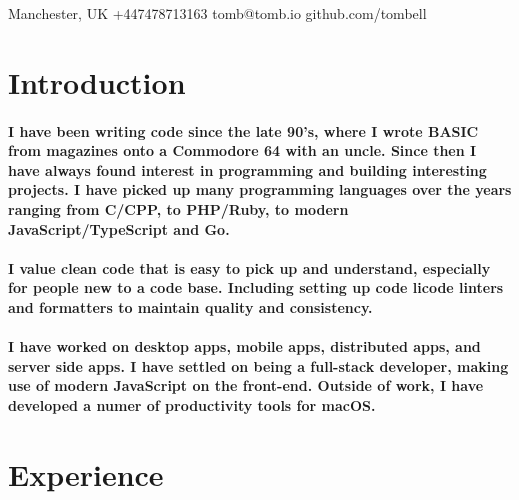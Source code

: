 \documentclass[a4paper]{article}
\author{Tom Bell}
\renewcommand{\maketitle}{
  \begin{center}
    \huge{\textbf\theauthor}
  \end{center}
}
\begin{document}
\maketitle

\begin{center}
  \raisebox{0\height}{\small\faMapMarker} Manchester, UK
  \hspace{1 cm}
  \raisebox{-0.1\height}{\small\faMobile} +447478713163
  \hspace{1 cm}
  \raisebox{-0.1\height}{\small\faEnvelope} tomb@tomb.io
  \hspace{1 cm}
  \raisebox{-0.1\height}{\small\faGithubAlt} github.com/tombell
\end{center}

\section{Introduction}
\paragraph{I have been writing code since the late 90's, where I wrote BASIC
from magazines onto a Commodore 64 with an uncle. Since then I have always found
interest in programming and building interesting projects. I have picked up many
programming languages over the years ranging from C/CPP, to PHP/Ruby, to modern
JavaScript/TypeScript and Go.}

\paragraph{I value clean code that is easy to pick up and understand, especially
for people new to a code base. Including setting up code licode linters and
formatters to maintain quality and consistency.}

\paragraph{I have worked on desktop apps, mobile apps, distributed apps, and
server side apps. I have settled on being a full-stack developer, making use of
modern JavaScript on the front-end. Outside of work, I have developed a numer of
productivity tools for macOS.}

\section{Experience}
\end{document}
